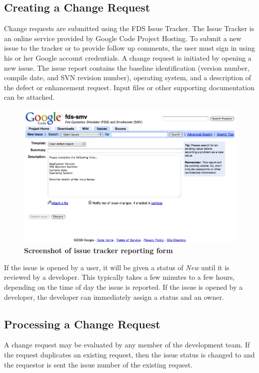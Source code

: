 \documentclass[11pt]{book}
\begin{document}
\subsection{Creating a Change Request}

Change requests are submitted using the FDS Issue Tracker.  The Issue Tracker is an online service provided by Google Code Project Hosting. To submit a new issue to the tracker or to provide follow up comments, the user must sign in using his or her Google account credentials. A change request is initiated by opening a new issue.  The issue report contains the baseline identification (version number, compile date, and SVN revision number), operating system, and a description of the defect or enhancement request.  Input files or other supporting documentation can be attached.
\begin{figure}[ht!]
\includegraphics[width=\textwidth]{FIGURES/NewIssue}
\caption{\bf Screenshot of issue tracker reporting form}
\label{fig:issueform}
\end{figure}
If the issue is opened by a user, it will be given a status of {\em New} until it is reviewed by a developer. This typically takes a few minutes to a few hours, depending on the time of day the issue is reported. If the issue is opened by a developer, the developer can immediately assign a status and an owner.

\subsection{Processing a Change Request}

A change request may be evaluated by any member of the development team. If the request duplicates an existing request, then the issue status is changed to  and the
requestor is sent the issue number of the existing request.
\end{document}
